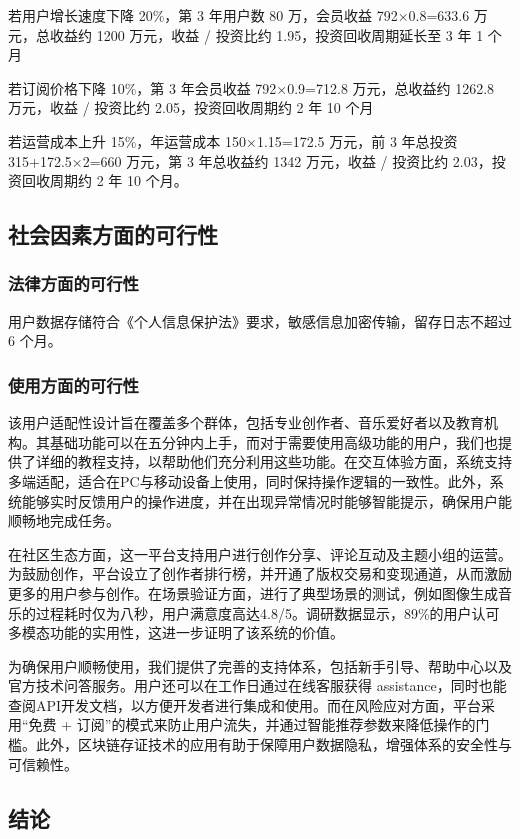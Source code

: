 \documentclass{base}
\numberwithin{figure}{section} %
\begin{document}
若用户增长速度下降 20\%，第 3 年用户数 80 万，会员收益 792×0.8=633.6 万元，总收益约 1200 万元，收益 / 投资比约 1.95，投资回收周期延长至 3 年 1 个月

若订阅价格下降 10\%，第 3 年会员收益 792×0.9=712.8 万元，总收益约 1262.8 万元，收益 / 投资比约 2.05，投资回收周期约 2 年 10 个月

若运营成本上升 15\%，年运营成本 150×1.15=172.5 万元，前 3 年总投资 315+172.5×2=660 万元，第 3 年总收益约 1342 万元，收益 / 投资比约 2.03，投资回收周期约 2 年 10 个月。

\subsection{社会因素方面的可行性}

\subsubsection{法律方面的可行性}

用户数据存储符合《个人信息保护法》要求，敏感信息加密传输，留存日志不超过 6 个月。

\subsubsection{使用方面的可行性}

该用户适配性设计旨在覆盖多个群体，包括专业创作者、音乐爱好者以及教育机构。其基础功能可以在五分钟内上手，而对于需要使用高级功能的用户，我们也提供了详细的教程支持，以帮助他们充分利用这些功能。在交互体验方面，系统支持多端适配，适合在PC与移动设备上使用，同时保持操作逻辑的一致性。此外，系统能够实时反馈用户的操作进度，并在出现异常情况时能够智能提示，确保用户能顺畅地完成任务。

在社区生态方面，这一平台支持用户进行创作分享、评论互动及主题小组的运营。为鼓励创作，平台设立了创作者排行榜，并开通了版权交易和变现通道，从而激励更多的用户参与创作。在场景验证方面，进行了典型场景的测试，例如图像生成音乐的过程耗时仅为八秒，用户满意度高达4.8/5。调研数据显示，89\%的用户认可多模态功能的实用性，这进一步证明了该系统的价值。

为确保用户顺畅使用，我们提供了完善的支持体系，包括新手引导、帮助中心以及官方技术问答服务。用户还可以在工作日通过在线客服获得 assistance，同时也能查阅API开发文档，以方便开发者进行集成和使用。而在风险应对方面，平台采用“免费 + 订阅”的模式来防止用户流失，并通过智能推荐参数来降低操作的门槛。此外，区块链存证技术的应用有助于保障用户数据隐私，增强体系的安全性与可信赖性。

\subsection{结论}
\end{document}

